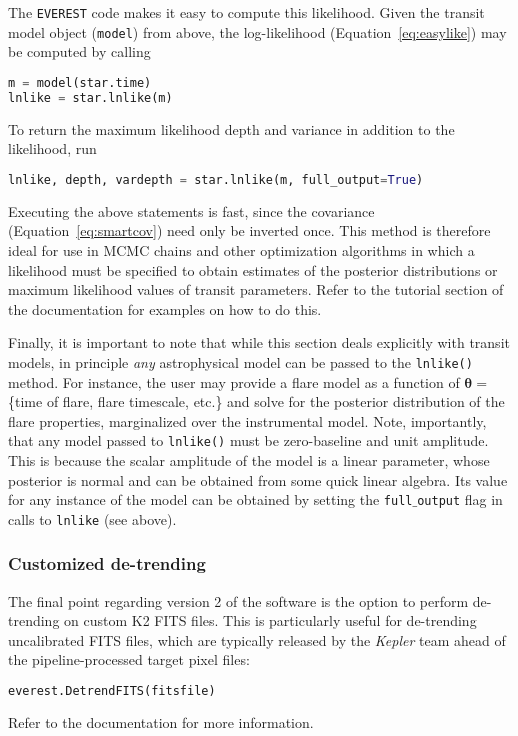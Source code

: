 \documentclass[]{emulateapj}
\newcommand{\edited}[1]{{\color{red} #1}}
\begin{document}
The \texttt{EVEREST} code makes it easy to compute this likelihood.
Given the transit model object (\texttt{model}) from above, the log-likelihood
(Equation~\ref{eq:easylike}) may be computed by calling
%
\begin{lstlisting}[language=Python]
m = model(star.time)
lnlike = star.lnlike(m)
\end{lstlisting}
%
To return the maximum likelihood depth and variance in addition to the
likelihood, run
%
\begin{lstlisting}[language=Python]
lnlike, depth, vardepth = star.lnlike(m, full_output=True)
\end{lstlisting}
%
Executing the above statements
is fast, since the covariance (Equation~\ref{eq:smartcov}) need only be
inverted once. This method is therefore ideal for use in MCMC chains and other
optimization algorithms in which a likelihood must be specified to
obtain estimates of the posterior distributions or maximum likelihood values
of transit parameters. Refer to the tutorial section of the documentation for
examples on how to do this.

Finally, it is important to note that while this section deals explicitly with
transit models, in principle \emph{any} astrophysical model can be passed to
the \texttt{lnlike()} method. For instance, the user may provide a flare model
as a function of $\mathbf{\theta} =$ \{time of flare, flare timescale, etc.\}
and solve for the posterior distribution of the flare properties, marginalized
over the instrumental model. Note, importantly, that any model passed to
\texttt{lnlike()} must be zero-baseline and unit amplitude. This is because
the scalar amplitude of the model is a linear parameter, whose posterior is
normal and can be obtained from some quick linear algebra. Its value for any
instance of the model can be obtained by setting the \texttt{full$\_$output}
flag in calls to \texttt{lnlike} (see above).\\[0em]

\edited{\subsubsection{Customized de-trending}}
\label{sec:custom_detrending}
The final point regarding version 2 of the software is the option to perform
de-trending on custom K2 FITS files. This is particularly useful for de-trending
uncalibrated FITS files, which are typically released by the \emph{Kepler}
team ahead of the pipeline-processed target pixel files:
%
\begin{lstlisting}[language=Python]
everest.DetrendFITS(fitsfile)
\end{lstlisting}
%
Refer to the documentation for more information.\\[0em]
\end{document}
